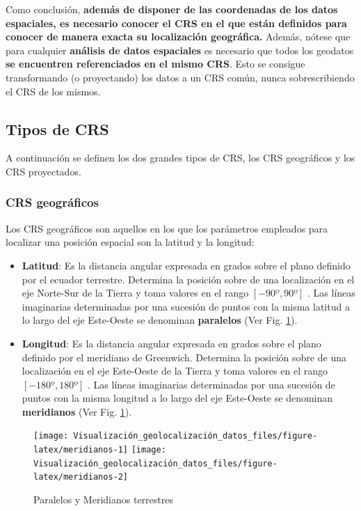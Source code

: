 \documentclass[
]{book}
\theoremstyle{definition}
\theoremstyle{definition}
\theoremstyle{definition}
\theoremstyle{definition}
\theoremstyle{remark}
\begin{document}
Como conclusión, \textbf{además de disponer de las coordenadas de los datos
espaciales, es necesario conocer el CRS en el que están definidos para conocer
de manera exacta su localización geográfica.} Además, nótese que para cualquier
\textbf{análisis de datos espaciales} es necesario que todos los geodatos \textbf{se
encuentren referenciados en el mismo CRS}. Esto se consigue transformando (o
proyectando) los datos a un CRS común, nunca sobrescribiendo el CRS de los
mismos.

\hypertarget{tipos-de-crs}{%
\subsection{Tipos de CRS}\label{tipos-de-crs}}

A continuación se definen los dos grandes tipos de CRS, los CRS geográficos y
los CRS proyectados.

\hypertarget{crs-geogruxe1ficos}{%
\subsubsection{CRS geográficos}\label{crs-geogruxe1ficos}}

Los CRS geográficos son aquellos en los que los parámetros empleados para
localizar una posición espacial son la latitud y la longitud:

\begin{itemize}
\item
  \textbf{Latitud}: Es la distancia angular expresada en grados sobre el plano
  definido por el ecuador terrestre. Determina la posición sobre de una
  localización en el eje Norte-Sur de la Tierra y toma valores en el rango
  \([-90º,90º]\) . Las líneas imaginarias determinadas por una sucesión de
  puntos con la misma latitud a lo largo del eje Este-Oeste se denominan
  \textbf{paralelos} (Ver Fig. \ref{fig:meridianos}).
\item
  \textbf{Longitud}: Es la distancia angular expresada en grados sobre el plano
  definido por el meridiano de Greenwich. Determina la posición sobre de una
  localización en el eje Este-Oeste de la Tierra y toma valores en el rango
  \([-180º,180º]\) . Las líneas imaginarias determinadas por una sucesión de
  puntos con la misma longitud a lo largo del eje Este-Oeste se denominan
  \textbf{meridianos} (Ver Fig. \ref{fig:meridianos}).
\end{itemize}

\begin{figure}

{\centering \texttt{[image: Visualización\_geolocalización\_datos\_files/figure-latex/meridianos-1]} \texttt{[image: Visualización\_geolocalización\_datos\_files/figure-latex/meridianos-2]} 

}

\caption{Paralelos y Meridianos terrestres}\label{fig:meridianos}
\end{figure}
\end{document}
